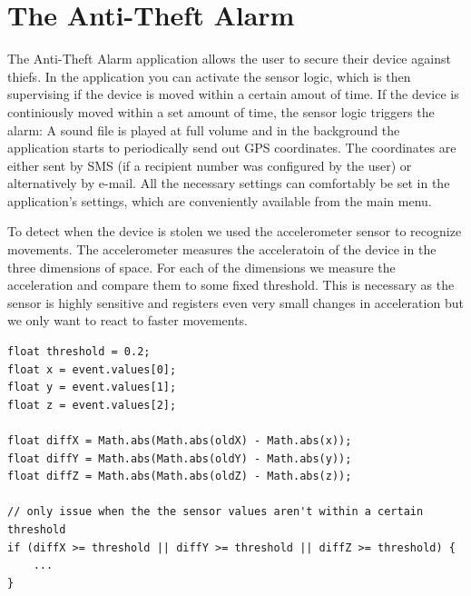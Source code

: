 \documentclass{report}
\newcommand{\lfig}[1]{\label{fig:#1}}
\begin{document}
\section{The Anti-Theft Alarm}

The Anti-Theft Alarm application allows the user to secure their device against thiefs. In the application you can activate the sensor logic, which is then supervising if the device is moved within a certain amout of time. If the device is continiously moved within a set amount of time, the sensor logic triggers the alarm: A sound file is played at full volume and in the background the application starts to periodically send out GPS coordinates. The coordinates are either sent by SMS (if a recipient number was configured by the user) or alternatively by e-mail. All the necessary settings can comfortably be set in the application's settings, which are conveniently available from the main menu.

To detect when the device is stolen we used the accelerometer sensor to recognize movements. The accelerometer measures the acceleratoin of the device in the three dimensions of space. For each of the dimensions we measure the acceleration and compare them to some fixed threshold. This is necessary as the sensor is highly sensitive and registers even very small changes in acceleration but we only want to react to faster movements.

\begin{lstlisting}
float threshold = 0.2;
float x = event.values[0];
float y = event.values[1];
float z = event.values[2];

float diffX = Math.abs(Math.abs(oldX) - Math.abs(x));
float diffY = Math.abs(Math.abs(oldY) - Math.abs(y));
float diffZ = Math.abs(Math.abs(oldZ) - Math.abs(z));

// only issue when the the sensor values aren't within a certain threshold
if (diffX >= threshold || diffY >= threshold || diffZ >= threshold) {
	...
}
\end{lstlisting}

\end{document}
